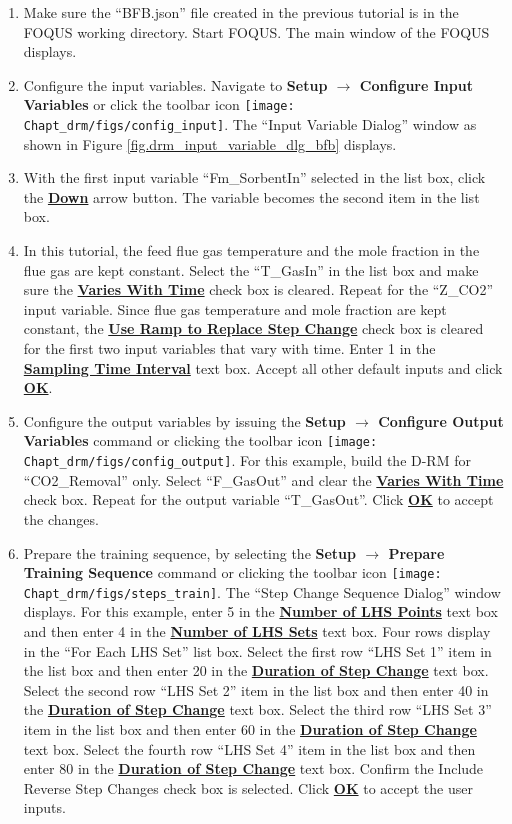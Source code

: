 \begin{enumerate}
	\item Make sure the ``BFB.json'' file created in the previous tutorial is in the FOQUS working directory.  Start FOQUS.  The main window of the FOQUS displays.
	\item Configure the input variables.  Navigate to \textbf{Setup $\rightarrow$ Configure Input Variables} or click the toolbar icon \texttt{[image: Chapt\_drm/figs/config\_input]}.  The ``Input Variable Dialog'' window as shown in Figure \ref{fig.drm_input_variable_dlg_bfb} displays.
	\item With the first input variable ``Fm\_SorbentIn'' selected in the list box, click the \textbf{\underline{Down}} arrow button.  The variable becomes the second item in the list box.
	\item In this tutorial, the feed flue gas temperature and the mole fraction in the flue gas are kept constant.  Select the ``T\_GasIn'' in the list box and make sure the \textbf{\underline{Varies With Time}} check box is cleared.  Repeat for the ``Z\_CO2'' input variable.  Since flue gas temperature and mole fraction are kept constant, the \textbf{\underline{Use Ramp to Replace Step Change}} check box is cleared for the first two input variables that vary with time.  Enter 1 in the \textbf{\underline{Sampling Time Interval}} text box.  Accept all other default inputs and click \textbf{\underline{OK}}.
	\item Configure the output variables by issuing the \textbf{Setup $\rightarrow$ Configure Output Variables} command or clicking the toolbar icon \texttt{[image: Chapt\_drm/figs/config\_output]}.  For this example, build the D-RM for ``CO2\_Removal'' only.  Select ``F\_GasOut'' and clear the \textbf{\underline{Varies With Time}} check box.  Repeat for the output variable ``T\_GasOut''. Click \textbf{\underline{OK}} to accept the changes.
	\item Prepare the training sequence, by selecting the \textbf{Setup $\rightarrow$ Prepare Training Sequence} command or clicking the toolbar icon \texttt{[image: Chapt\_drm/figs/steps\_train]}.  The ``Step Change Sequence Dialog'' window displays.  For this example, enter 5 in the \textbf{\underline{Number of LHS Points}} text box and then enter 4 in the \textbf{\underline{Number of LHS Sets}} text box.  Four rows display in the ``For Each LHS Set'' list box.  Select the first row ``LHS Set 1'' item in the list box and then enter 20 in the \textbf{\underline{Duration of Step Change}} text box.  Select the second row ``LHS Set 2'' item in the list box and then enter 40 in the \textbf{\underline{Duration of Step Change}} text box.  Select the third row ``LHS Set 3'' item in the list box and then enter 60 in the \textbf{\underline{Duration of Step Change}} text box.  Select the fourth row ``LHS Set 4'' item in the list box and then enter 80 in the \textbf{\underline{Duration of Step Change}} text box.  Confirm the Include Reverse Step Changes check box is selected.  Click \textbf{\underline{OK}} to accept the user inputs.

\end{enumerate}
